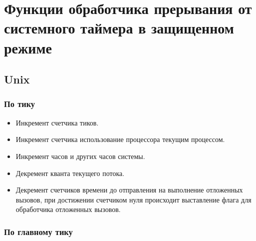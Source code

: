 \setcounter{page}{2}
\chapter{Функции обработчика прерывания от системного таймера в защищенном режиме}


\section{Unix} %
\subsection*{По тику}

\begin{itemize}
	\item Инкремент счетчика тиков.
	\item Инкремент счетчика использование процессора текущим процессом. %
	\item Инкремент часов и других часов системы.
	\item Декремент кванта текущего потока.
	\item Декремент счетчиков времени до отправления на выполнение отложенных вызовов, при достижении счетчиком нуля происходит выставление флага для обработчика отложенных вызовов.
\end{itemize}

\subsection*{По главному тику}


